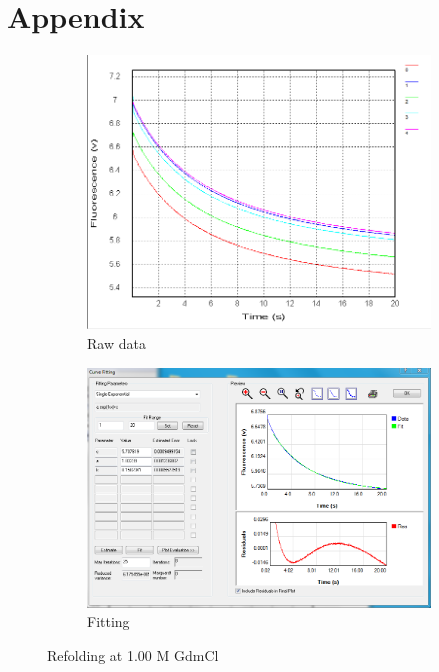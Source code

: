 \documentclass[a4paper,english,12pt,bibliography=totoc]{scrreprt}
\begin{document}
\printbibliography

\chapter{Appendix}
\label{cha:Appendix}

\begin{figure}[H]
    \centering
    \begin{subfigure}[b]{0.45\textwidth}
        \centering
        \includegraphics[width=\textwidth]{Images/G8/rf1_raw.PNG}
        \caption{Raw data }
        \label{fig:sub1}
    \end{subfigure}
    \hspace{0cm} %
    \begin{subfigure}[b]{0.45\textwidth}
        \centering
        \includegraphics[width=\textwidth]{Images/G8/rf1_fitting.PNG}
        \caption{Fitting}
        \label{fig:sub2}
    \end{subfigure}
    \caption{Refolding at  1.00 M GdmCl }
    \label{fig:main}
\end{figure}
\end{document}
